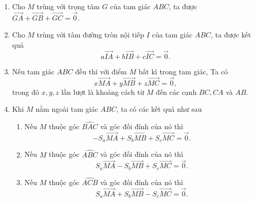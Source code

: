 \begin{note}
	\begin{enumerate}
		\item Cho $M$ trùng với trọng tâm $G$ của tam giác $ABC$, ta được $ \overrightarrow {GA}  +  \overrightarrow{GB}  +  \overrightarrow{GC}= \overrightarrow {0}$.
		\item Cho $M$ trùng với tâm đường tròn nội tiếp $I$ của tam giác $ABC$, ta được kết quả\\ \[a\overrightarrow {IA}  +  b\overrightarrow {IB}  +  c\overrightarrow {IC}= \overrightarrow {0}.\]
		\item Nếu tam giác $ABC$ đều thì với điểm $M$ bất kì trong tam giác, Ta có
		      \[x\overrightarrow {MA}  +  y\overrightarrow {MB}  +  z\overrightarrow {MC}= \overrightarrow {0},\]
		      trong đó $x,y,z$ lần lượt là khoảng cách từ $M$ đến các cạnh $BC,CA$ và $AB$.
		\item Khi $M$ nằm ngoài tam giác $ABC$, ta có các kết quả như sau
		      \begin{enumerate}
			      \item Nếu $M$ thuộc góc $\widehat{BAC}$ và góc đối đỉnh của nó thì  $$  -  S_a\overrightarrow {MA}  +  S_b\overrightarrow {MB}  +  S_c\overrightarrow {MC}= \overrightarrow {0}.$$
			      \item Nếu $M$ thuộc góc $\widehat{ABC}$ và góc đối đỉnh của nó thì  $$S_a\overrightarrow {MA}  -  S_b\overrightarrow {MB}  +  S_c\overrightarrow {MC}= \overrightarrow {0}.$$
			      \item Nếu $M$ thuộc góc $\widehat{ACB}$ và góc đối đỉnh của nó thì  $$S_a\overrightarrow {MA}  +  S_b\overrightarrow {MB}  -S_c\overrightarrow {MC}= \overrightarrow {0}.$$
		      \end{enumerate}
	\end{enumerate}
\end{note}
